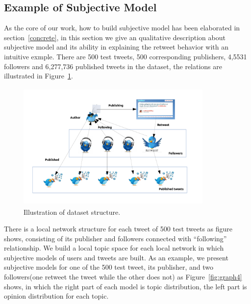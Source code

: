\documentclass[preprint,times]{elsarticle}
\begin{document}
\subsection{Example of Subjective Model}
\label{example}
As the core of our work, how to build subjective model has been elaborated in section~\ref{concrete}, in this section we give an qualitative description about subjective model and its ability in explaining the retweet behavior with an intuitive exmple. 
There are 500 test tweets, 500 corresponding publishers, 4,5531 followers and 6,277,736 published tweets in the dataset, the relations are illustrated in Figure~\ref{fig:graph3}.
\begin{figure}[htb]
\centering%
\includegraphics[width=3.8in,height=2.5in]{dataset.pdf}
\caption{Illustration of dataset structure.}
\label{fig:graph3}
\end{figure}
There is a local network structure for each tweet of 500 test tweets as figure shows, consisting of its publisher and followers connected with ``following'' relationship.
We build a local topic space for each local network in which subjective models of users and tweets are built.
As an example, we present subjective models for one of the 500 test tweet, its publisher, and two followers(one retweet the tweet while the other does not) as Figure~\ref{fig:graph4} shows, in which the right part of each model is topic distribution, the left part is opinion distribution for each topic.
\end{document}
